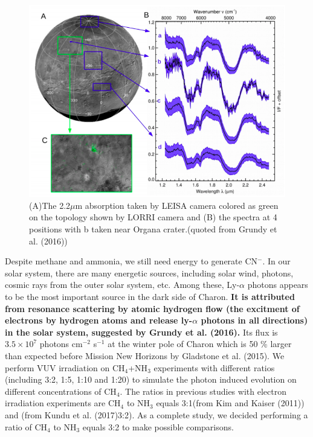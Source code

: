 \begin{figure}
\centering
\includegraphics[width=\textwidth]{figures/chapter1/IR.png}
\caption{(A)The 2.2$\mu$m absorption taken by LEISA camera colored as green on the topology shown by LORRI camera and (B) the spectra at 4 positions with b taken near Organa crater.(quoted from Grundy et al. (2016)\cite{grundy2016surface})}
\label{fig:Charon_IR}
\end{figure}

Despite methane and ammonia, we still need energy to generate CN$^-$. In our solar system, there are many energetic sources, including solar wind, photons, cosmic rays from the outer solar system, etc. Among these, Ly-$\alpha$ photons appears to be the most important source in the dark side of Charon. \textbf{ It is attributed from resonance scattering by atomic hydrogen flow (the excitment of electrons by hydrogen atoms and release ly-$\alpha$ photons in all directions) in the solar system, suggested by Grundy et al. (2016)\cite{grundy2016formation}.} Its flux is $3.5 \times 10^7$ photons cm$^{-2}$ s$^{-1}$ at the winter pole of Charon which is 50 \% larger than expected before Mission New Horizons by Gladstone et al. (2015)\cite{gladstone2015lyalpha}. We perform VUV irradiation on CH$_4$+NH$_3$ experiments with different ratios (including 3:2, 1:5, 1:10 and 1:20) to simulate the photon induced evolution on different concentrations of CH$_4$. The ratios in previous studies with electron irradiation experiments are CH$_4$ to NH$_3$ equals 3:1(from Kim and Kaiser (2011)\cite{kim}) and (from Kundu et al. (2017)3:2\cite{kundu2017electron}). As a complete study, we decided performing a ratio of CH$_4$ to NH$_3$ equals 3:2 to make possible comparisons.

